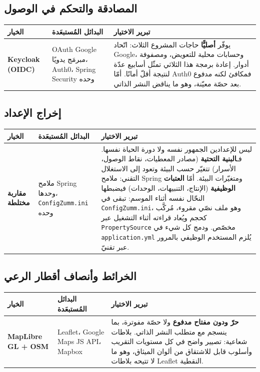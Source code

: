 \subsection{المصادقة والتحكم في الوصول}
\begin{xltabular}{\textwidth}{>{\bfseries}p{2.7cm} p{4.2cm} X}
\toprule
\textbf{الخيار} & \textbf{البدائل المُستبعَدة} & \textbf{تبرير الاختيار} \\
\midrule
\endhead
Keycloak (OIDC) & OAuth Google مبرمَج يدويًا، Auth0، Spring Security وحده & يوفّر \textbf{أصليًّا} حاجات المشروع الثلاث: اتّحاد Google، وحسابات محلية للتعويض، ومصفوفة أدوار. إعادة برمجة هذا الثلاثي تمثّل أسابيع عدّة لنتيجة أقلّ أمانًا. أمّا Auth0 فمكافئ لكنه مدفوع بعد حصّة معيّنة، وهو ما يناقض النشر الذاتي. \\
\bottomrule
\end{xltabular}

\subsection{إخراج الإعداد}
\begin{xltabular}{\textwidth}{>{\bfseries}p{2.7cm} p{4.2cm} X}
\toprule
\textbf{الخيار} & \textbf{البدائل المُستبعَدة} & \textbf{تبرير الاختيار} \\
\midrule
\endhead
مقاربة مختلطة & ملامح Spring وحدها، \texttt{ConfigZumm.ini} وحده & ليس للإعدادين الجمهور نفسه ولا دورة الحياة نفسها. فـ\textbf{البنية التحتية} (مصادر المعطيات، نقاط الوصول، الأسرار) تتغيّر حسب البيئة وتعود إلى الاستغلال التقني: ملامح Spring ومتغيّرات البيئة. أمّا \textbf{العتبات الوظيفية} (الإنتاج، التنبيهات، الوحدات) فيضبطها النحّال نفسه أثناء الموسم: تبقى في \texttt{ConfigZumm.ini}، وهو ملف نصّي مقروء، مُركَّب كحجم ويُعاد قراءته أثناء التشغيل عبر \texttt{PropertySource} مخصّص. ودمج كل شيء في \texttt{application.yml} يُلزم المستخدم الوظيفي بالمرور عبر تقنيّ. \\
\bottomrule
\end{xltabular}

\subsection{الخرائط وأنصاف أقطار الرعي}
\begin{xltabular}{\textwidth}{>{\bfseries}p{2.7cm} p{4.2cm} X}
\toprule
\textbf{الخيار} & \textbf{البدائل المُستبعَدة} & \textbf{تبرير الاختيار} \\
\midrule
\endhead
MapLibre GL + OSM & Leaflet، Google Maps JS API، Mapbox & \textbf{حرّ ودون مفتاح مدفوع} ولا حصّة مفوترة، بما ينسجم مع متطلب النشر الذاتي. بلاطات شعاعية: تصيير واضح في كل مستويات التقريب وأسلوب قابل للاشتقاق من ألوان الميثاق، وهو ما لا تتيحه بلاطات Leaflet النقطية. \\
\bottomrule
\end{xltabular}

